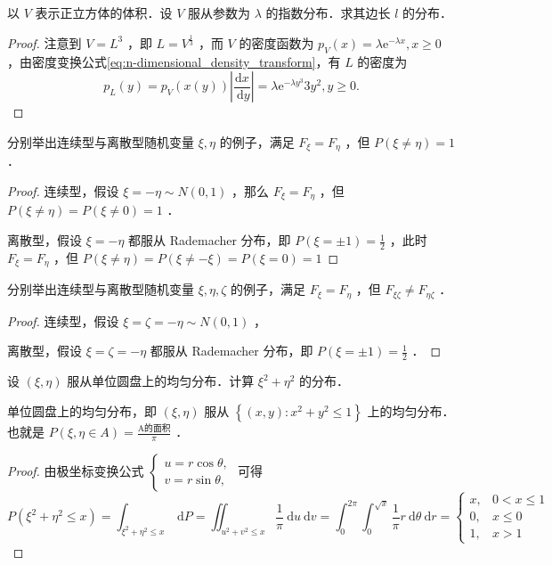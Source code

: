 \begin{exercise}
    以 $V$ 表示正立方体的体积．设 $V$ 服从参数为 $\lambda$ 的指数分布．求其边长 $l$ 的分布．
\end{exercise}
\begin{proof}
    注意到 $V=L^3$ ，即 $L=V^{\frac{1}{3}}$ ，而 $V$ 的密度函数为 $p_V(x)=\lambda \mathrm{e}^{-\lambda x}, x \geq 0$ ，由密度变换公式\ref{eq:n-dimensional_density_transform}，有 $L$ 的密度为
    $$
        p_L(y)=p_V(x(y))\left|\frac{\mathrm{d} x}{\mathrm{~d} y}\right|=\lambda \mathrm{e}^{-\lambda y^3} 3 y^2, y \geq 0 .
    $$
\end{proof}
\begin{exercise}
    分别举出连续型与离散型随机变量 $\xi, \eta$ 的例子，满足 $F_{\xi}=F_\eta$ ，但 $P(\xi \neq \eta)=1$ ．
\end{exercise}
\begin{proof}
    连续型，假设 $\xi=-\eta \sim N(0,1)$ ，那么 $F_{\xi}=F_\eta$ ，但 $P(\xi \neq \eta)=P(\xi \neq 0)=1$ ．

    离散型，假设 $\xi=-\eta$ 都服从 Rademacher 分布，即 $P(\xi= \pm 1)=\frac{1}{2}$ ，此时 $F_{\xi}=F_\eta$ ，但 $P(\xi \neq \eta)=P(\xi \neq -\xi)=P(\xi=0)=1$
\end{proof}
\begin{exercise}
    分别举出连续型与离散型随机变量 $\xi, \eta, \zeta$ 的例子，满足 $F_{\xi}=F_\eta$ ，但 $F_{\xi \zeta} \neq F_{\eta \zeta}$ ．
\end{exercise}
\begin{proof}
    连续型，假设 $\xi=\zeta=-\eta \sim N(0,1)$ ，

    离散型，假设 $\xi=\zeta=-\eta$ 都服从 Rademacher 分布，即 $P(\xi= \pm 1)=\frac{1}{2}$ ．
\end{proof}
\begin{exercise}
    设 $(\xi, \eta)$ 服从单位圆盘上的均匀分布．计算 $\xi^2+\eta^2$ 的分布．
\end{exercise}
\begin{note}
    单位圆盘上的均匀分布，即 $(\xi, \eta)$ 服从 $\left\{(x, y): x^2+y^2 \leq 1\right\}$ 上的均匀分布．也就是 $P(\xi, \eta \in A)=\frac{\text{A的面积}}{\pi}$ ．
\end{note}
\begin{proof}
    由极坐标变换公式 $\left\{\begin{array}{l}u=r \cos \theta, \\ v=r \sin \theta,\end{array}\right.$ 可得
    $$
        P\left(\xi^2+\eta^2 \leq x\right)=\int_{\xi^2+\eta^2 \leq x} \mathrm{~d} P=\iint_{u^2+v^2 \leq x} \frac{1}{\pi} \mathrm{~d} u \mathrm{~d} v=\int_0^{2 \pi} \int_0^{\sqrt{x}} \frac{1}{\pi} r \mathrm{~d} \theta \mathrm{~d} r= \begin{cases}x, & 0<x \leq 1 \\ 0, & x \leq 0 \\ 1, & x>1\end{cases}
    $$
\end{proof}
